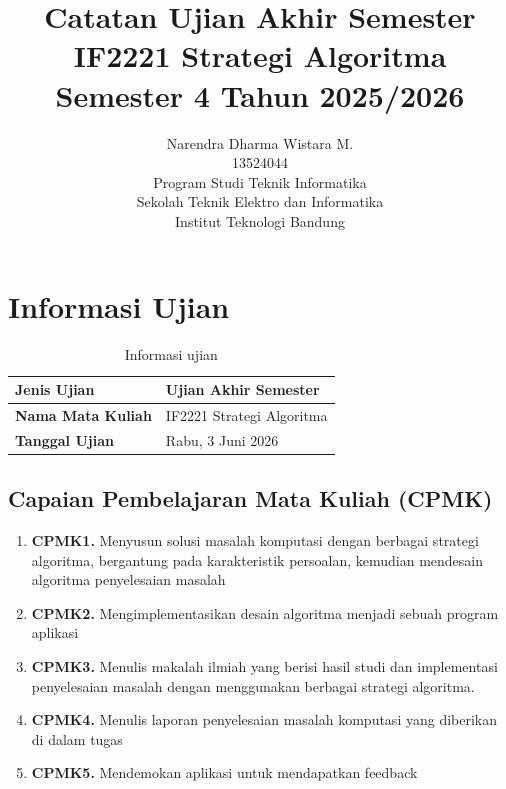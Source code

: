 \documentclass[11pt,a4paper]{article}
\title{%
    \vspace{-2cm}
    \textbf{\LARGE Catatan Ujian Akhir Semester} \\[0.25em]
    \Large IF2221 Strategi Algoritma \\[0.25em]
    \normalsize Semester 4 Tahun 2025/2026 \\[2em]
}
\author{%
    Narendra Dharma Wistara M. \\[0.25em]
    13524044 \\[2.5em]
    Program Studi Teknik Informatika \\[0.25em]
    Sekolah Teknik Elektro dan Informatika \\[0.25em]
    Institut Teknologi Bandung \\[0.25em]
}
\begin{document}
\begin{titlepage}
    \maketitle
    \thispagestyle{empty}
\end{titlepage}

\clearpage

\tableofcontents

\clearpage
{}

\section{Informasi Ujian}

\begin{table}[H]
    \centering
    \begin{tabularx}{\textwidth}{|L{0.30\textwidth}|X|}
        \hline
        \textbf{Jenis Ujian} & Ujian Akhir Semester \\
        \hline
        \textbf{Nama Mata Kuliah} & IF2221 Strategi Algoritma \\
        \hline
        \textbf{Tanggal Ujian} & Rabu, 3 Juni 2026 \\
        \hline
    \end{tabularx}
    \caption{Informasi ujian}
    \label{tab:informasi-ujian}
\end{table}

\subsection{Capaian Pembelajaran Mata Kuliah (CPMK)}

\begin{enumerate}
    \item \textbf{CPMK1.} Menyusun solusi masalah komputasi dengan berbagai strategi algoritma,
    bergantung pada karakteristik persoalan, kemudian mendesain algoritma
    penyelesaian masalah

    \item \textbf{CPMK2.} Mengimplementasikan desain algoritma menjadi sebuah program
    aplikasi

    \item \textbf{CPMK3.} Menulis makalah ilmiah yang berisi hasil studi dan implementasi
    penyelesaian masalah dengan menggunakan berbagai strategi algoritma.

    \item \textbf{CPMK4.} Menulis laporan penyelesaian masalah komputasi yang diberikan di dalam tugas

    \item \textbf{CPMK5.} Mendemokan aplikasi untuk mendapatkan feedback
\end{enumerate}
\end{document}
